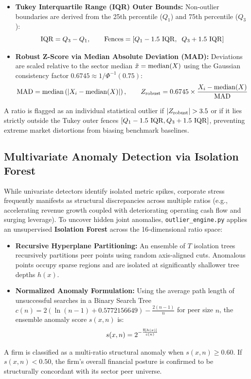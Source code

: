 \begin{itemize}
    \item \textbf{Tukey Interquartile Range (IQR) Outer Bounds:} Non-outlier boundaries are derived from the 25th percentile ($Q_1$) and 75th percentile ($Q_3$):
    \begin{equation}
        \operatorname{IQR} = Q_3 - Q_1, \qquad \text{Fences} = \left[Q_1 - 1.5\,\operatorname{IQR},\;\; Q_3 + 1.5\,\operatorname{IQR}\right]
    \end{equation}
    
    \item \textbf{Robust Z-Score via Median Absolute Deviation (MAD):} Deviations are scaled relative to the sector median $\tilde{x} = \operatorname{median}(X)$ using the Gaussian consistency factor $0.6745 \approx 1/\Phi^{-1}(0.75)$:
    \begin{equation}
        \operatorname{MAD} = \operatorname{median}\left(|X_i - \operatorname{median}(X)|\right), \qquad Z_{\text{robust}} = 0.6745 \times \frac{X_i - \operatorname{median}(X)}{\operatorname{MAD}}
    \end{equation}
\end{itemize}

\begin{decisionrule}
A ratio is flagged as an individual statistical outlier if $| Z_{\text{robust}} | > 3.5$ or if it lies strictly outside the Tukey outer fences $[Q_1 - 1.5\,\operatorname{IQR}, Q_3 + 1.5\,\operatorname{IQR}]$, preventing extreme market distortions from biasing benchmark baselines.
\end{decisionrule}

\subsection{Multivariate Anomaly Detection via Isolation Forest}
While univariate detectors identify isolated metric spikes, corporate stress frequently manifests as structural discrepancies across multiple ratios (e.g., accelerating revenue growth coupled with deteriorating operating cash flow and surging leverage). To uncover hidden joint anomalies, \texttt{outlier\_engine.py} applies an unsupervised \textbf{Isolation Forest} across the 16-dimensional ratio space:
\begin{itemize}
    \item \textbf{Recursive Hyperplane Partitioning:} An ensemble of $T$ isolation trees recursively partitions peer points using random axis-aligned cuts. Anomalous points occupy sparse regions and are isolated at significantly shallower tree depths $h(x)$.
    \item \textbf{Normalized Anomaly Formulation:} Using the average path length of unsuccessful searches in a Binary Search Tree $c(n) = 2\left(\ln(n - 1) + 0.5772156649\right) - \frac{2(n - 1)}{n}$ for peer size $n$, the ensemble anomaly score $s(x, n)$ is:
    \begin{equation}
        s(x, n) = 2^{-\frac{\mathbb{E}[h(x)]}{c(n)}}
    \end{equation}
\end{itemize}

\begin{decisionrule}
A firm is classified as a multi-ratio structural anomaly when $s(x, n) \ge 0.60$. If $s(x, n) < 0.50$, the firm's overall financial posture is confirmed to be structurally concordant with its sector peer universe.
\end{decisionrule}
